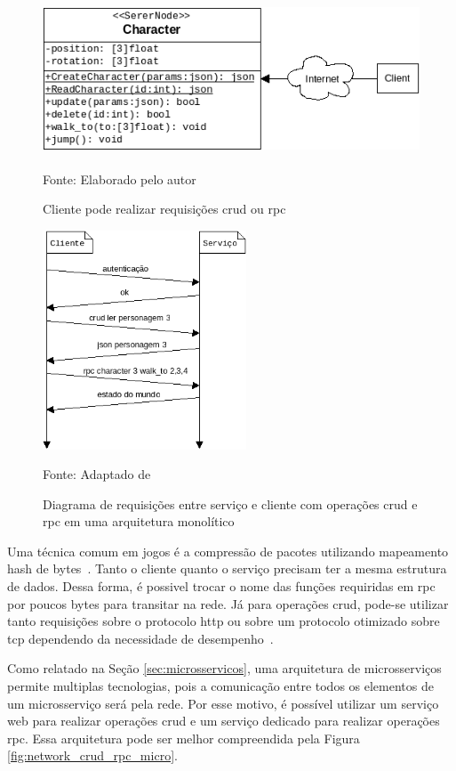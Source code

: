 \begin{figure}[htb!]
\caption{Cliente pode realizar requisições \ac{crud} ou \ac{rpc}}
\label{fig:crud_rpc}
\includegraphics[height=4.5cm]{img/cap2/crud_rpc.png}
\centering

Fonte: Elaborado pelo autor
\end{figure}



\begin{figure}[htb!]
\caption{Diagrama de requisições entre serviço e cliente com operações \ac{crud} e \ac{rpc} em uma arquitetura monolítico}
\label{fig:network_crud_rpc}
\includegraphics[height=6.5cm]{img/cap2/network_rpc_crud.png}
\centering

Fonte: Adaptado de~\cite{LeckyThompson2008Nov}
\end{figure}



Uma técnica comum em jogos é a compressão de pacotes utilizando mapeamento hash de bytes~\cite{LeckyThompson2008Nov}.
%
Tanto o cliente quanto o serviço precisam ter a mesma estrutura de dados.
%
Dessa forma, é possivel trocar o nome das funções requiridas em \ac{rpc} por poucos bytes para transitar na rede.
%
Já para operações \ac{crud}, pode-se utilizar tanto requisições sobre o protocolo \ac{http} ou sobre um protocolo otimizado sobre \ac{tcp} dependendo da necessidade de desempenho~\cite{LeckyThompson2008Nov}.

Como relatado na Seção \ref{sec:microsservicos}, uma arquitetura de microsserviços permite multiplas tecnologias, pois a comunicação entre todos os elementos de um microsserviço será pela rede.
%
Por esse motivo, é possível utilizar um serviço web para realizar operações \ac{crud} e um serviço dedicado para realizar operações \ac{rpc}.
%
Essa arquitetura pode ser melhor compreendida pela Figura \ref{fig:network_crud_rpc_micro}.


